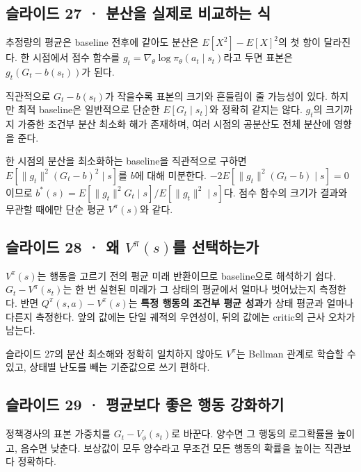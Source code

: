\documentclass[11pt,a4paper]{article}
\begin{document}
\subsection{슬라이드 27 · 분산을 실제로 비교하는 식}

추정량의 평균은 baseline 전후에 같아도 분산은 $E[X^2]-E[X]^2$의 첫 항이 달라진다. 한 시점에서 점수 함수를 $g_t=\nabla_\theta\log\pi_\theta(a_t\mid s_t)$라고 두면 표본은 $g_t(G_t-b(s_t))$가 된다.\par

직관적으로 $G_t-b(s_t)$가 작을수록 표본의 크기와 흔들림이 줄 가능성이 있다. 하지만 최적 baseline은 일반적으로 단순한 $E[G_t\mid s_t]$와 정확히 같지는 않다. $g_t$의 크기까지 가중한 조건부 분산 최소화 해가 존재하며, 여러 시점의 공분산도 전체 분산에 영향을 준다.\par

한 시점의 분산을 최소화하는 baseline을 직관적으로 구하면 $E[\|g_t\|^2(G_t-b)^2\mid s]$를 $b$에 대해 미분한다. $-2E[\|g_t\|^2(G_t-b)\mid s]=0$이므로 $b^*(s)=E[\|g_t\|^2G_t\mid s]/E[\|g_t\|^2\mid s]$다. 점수 함수의 크기가 결과와 무관할 때에만 단순 평균 $V^\pi(s)$와 같다.\par

\subsection{슬라이드 28 · 왜 $V^\pi(s)$를 선택하는가}

$V^\pi(s)$는 행동을 고르기 전의 평균 미래 반환이므로 baseline으로 해석하기 쉽다. $G_t-V^\pi(s_t)$는 한 번 실현된 미래가 그 상태의 평균에서 얼마나 벗어났는지 측정한다. 반면 $Q^\pi(s,a)-V^\pi(s)$는 \textbf{특정 행동의 조건부 평균 성과}가 상태 평균과 얼마나 다른지 측정한다. 앞의 값에는 단일 궤적의 우연성이, 뒤의 값에는 critic의 근사 오차가 남는다.\par

슬라이드 27의 분산 최소해와 정확히 일치하지 않아도 $V^\pi$는 Bellman 관계로 학습할 수 있고, 상태별 난도를 빼는 기준값으로 쓰기 편하다.\par

\subsection{슬라이드 29 · 평균보다 좋은 행동 강화하기}

정책경사의 표본 가중치를 $G_t-V_\phi(s_t)$로 바꾼다. 양수면 그 행동의 로그확률을 높이고, 음수면 낮춘다. 보상값이 모두 양수라고 무조건 모든 행동의 확률을 높이는 직관보다 정확하다.\par
\end{document}
